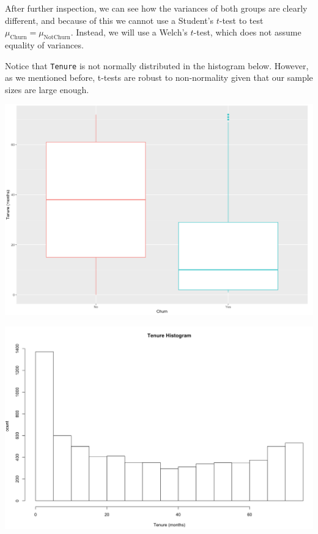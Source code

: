 \documentclass[man, floatsintext]{apa6}
\begin{document}
After further inspection, we can see how the variances of both groups are clearly different, and because of this we cannot use a Student's $t$-test to test $\mu_{\text{Churn}} = \mu_{\text{NotChurn}}$. Instead, we will use a Welch's $t$-test, which does not assume equality of variances.

Notice that \texttt{Tenure} is not normally distributed in the histogram below. However, as we mentioned before, t-tests are robust to non-normality given that our sample sizes are large enough.

\hspace{0.5mm}

\noindent\begin{minipage}{0.485\textwidth}
\includegraphics[width = \linewidth]{boxplot_tenurebyChurn}
\end{minipage}
\hfill
\begin{minipage}{0.5\textwidth}
\includegraphics[width = \linewidth]{histogram_Tenure}
\end{minipage}
\end{document}
